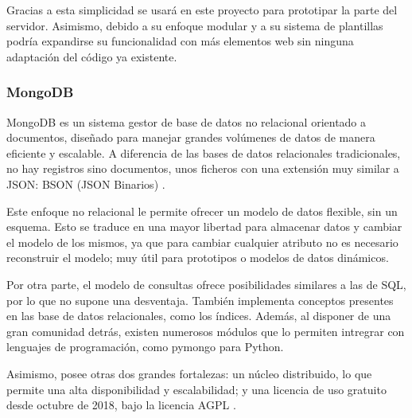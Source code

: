             Gracias a esta simplicidad se usará en este proyecto para prototipar la parte del servidor. Asimismo, debido a 
            su enfoque modular y a su sistema de plantillas podría expandirse su funcionalidad con más elementos web sin 
            ninguna adaptación del código ya existente.


        \subsubsection{MongoDB}
            MongoDB es un sistema gestor de base de datos no relacional orientado a documentos, diseñado para manejar 
            grandes volúmenes de datos de manera eficiente y escalable. A diferencia de las bases de datos relacionales 
            tradicionales, no hay registros sino documentos, unos ficheros con una extensión muy similar a JSON: BSON 
            (JSON Binarios) \cite{noauthor_json_nodate}. 

            Este enfoque no relacional le permite ofrecer un modelo de datos flexible, sin un esquema. Esto se traduce
            en una mayor libertad para almacenar datos y cambiar el modelo de los mismos, ya que para cambiar cualquier
            atributo no es necesario reconstruir el modelo; muy útil para prototipos o modelos de datos dinámicos.
            

            Por otra parte, el modelo de consultas ofrece posibilidades similares a las de SQL, por lo que no supone
            una desventaja. También implementa conceptos presentes en las base de datos relacionales, como los índices. 
            Además, al disponer de una gran comunidad detrás, existen numerosos módulos que lo permiten
            intregrar con lenguajes de programación, como pymongo para Python. 

            Asimismo, posee otras dos grandes fortalezas: un núcleo distribuido, lo que permite una alta disponibilidad
            y escalabilidad; y una licencia de uso gratuito desde octubre de 2018, bajo la licencia AGPL 
            \cite{noauthor_que_nodate}.
